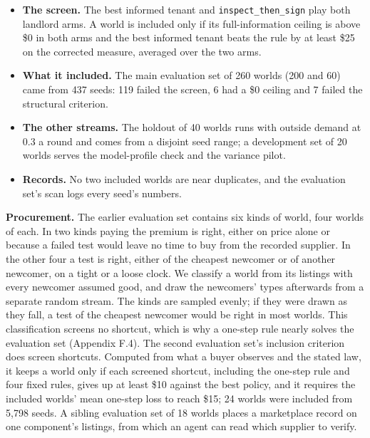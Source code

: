 \begin{itemize}
\tightlist
\item
  \textbf{The screen.} The best informed tenant and \texttt{inspect\_\allowbreak{}then\_\allowbreak{}sign} play both landlord arms. A world is included only
  if its full-information ceiling is above \$0 in both arms and the best informed tenant beats the rule by at least
  \$25 on the corrected measure, averaged over the two arms.
\item
  \textbf{What it included.} The main evaluation set of 260 worlds (200 and 60) came from 437 seeds: 119 failed the
  screen, 6 had a \$0 ceiling and 7 failed the structural criterion.
\item
  \textbf{The other streams.} The holdout of 40 worlds runs with outside demand at 0.3 a round and comes from a disjoint
  seed range; a development set of 20 worlds serves the model-profile check and the variance pilot.
\item
  \textbf{Records.} No two included worlds are near duplicates, and the evaluation set's scan logs every seed's numbers.
\end{itemize}

\textbf{Procurement.} The earlier evaluation set contains six kinds of world, four worlds of each. In two
kinds paying the premium is right, either on price alone or because a failed test would leave no
time to buy from the recorded supplier. In the other four a test is right, either of the cheapest
newcomer or of another newcomer, on a tight or a loose clock. We classify a world from its listings
with every newcomer assumed good, and draw the newcomers' types afterwards from a separate random
stream. The kinds are sampled evenly; if they were drawn as they fall, a test of the cheapest
newcomer would be right in most worlds. This classification screens no shortcut, which is why a
one-step rule nearly solves the evaluation set (Appendix F.4). The second evaluation set's inclusion
criterion does screen shortcuts. Computed from what a buyer observes and the stated law, it keeps a
world only if each screened shortcut, including the one-step rule and four fixed rules, gives up at
least \$10 against the best policy, and it requires the included worlds' mean one-step loss to reach
\$15; 24 worlds were included from 5,798 seeds. A sibling evaluation set of 18 worlds places a
marketplace record on one component's listings, from which an agent can read which supplier to
verify.


